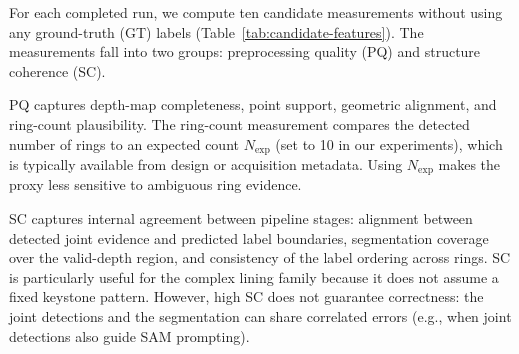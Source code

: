 \documentclass[a4paper,fleqn]{cas-dc}
\begin{document}
{For each completed run, we compute ten candidate measurements without using any ground-truth (GT) labels (Table~\ref{tab:candidate-features}). The measurements fall into two groups: preprocessing quality (PQ) and structure coherence (SC).

PQ captures depth-map completeness, point support, geometric alignment, and ring-count plausibility. The ring-count measurement compares the detected number of rings to an expected count $N_{\mathrm{exp}}$ (set to 10 in our experiments), which is typically available from design or acquisition metadata. Using $N_{\mathrm{exp}}$ makes the proxy less sensitive to ambiguous ring evidence.

SC captures internal agreement between pipeline stages: alignment between detected joint evidence and predicted label boundaries, segmentation coverage over the valid-depth region, and consistency of the label ordering across rings. SC is particularly useful for the complex lining family because it does not assume a fixed keystone pattern. However, high SC does not guarantee correctness: the joint detections and the segmentation can share correlated errors (e.g., when joint detections also guide SAM prompting).

}
\end{document}
